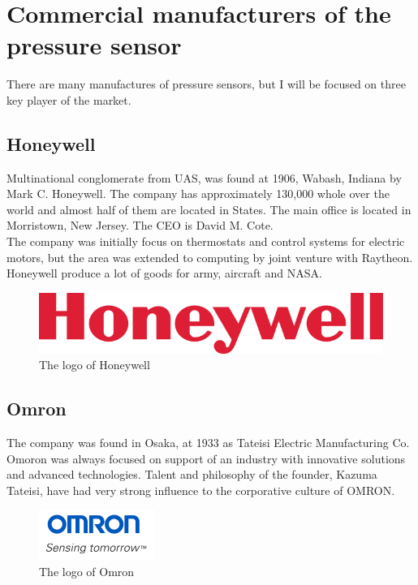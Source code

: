 \documentclass[english]{article}
\begin{document}
\section{Commercial manufacturers of the pressure sensor}

There are many manufactures of pressure sensors, but I will be focused on three key player of the market.

\subsection{Honeywell}

Multinational conglomerate from UAS, was found at 1906, Wabash, Indiana by Mark C. Honeywell. The company has approximately 130,000 whole over the world and almost half of them are located in States. The main office is located in  Morristown, New Jersey. The CEO is David M. Cote.\\

The company was initially focus on thermostats and control systems for electric motors, but the area was extended to computing by joint venture with Raytheon.\\

Honeywell produce a lot of goods for army, aircraft and NASA. \cite{honey}

 \begin{figure}[H]
\centerline{\includegraphics[scale=0.5]{PressureSensors/honey}}
\caption{The logo of Honeywell\label{fig:honey}}
\end{figure}

\subsection{Omron}

The company was found in Osaka, at 1933 as Tateisi Electric Manufacturing Co. Omoron was always focused on support of an industry with innovative solutions and advanced technologies. Talent and philosophy of the founder, Kazuma Tateisi, have had very strong influence to the corporative culture of OMRON.\cite{omron}\\

\begin{figure}[H]
\centerline{\includegraphics[scale=1]{PressureSensors/omron}}
\caption{The logo of Omron\label{fig:omron}}
\end{figure}
\end{document}
